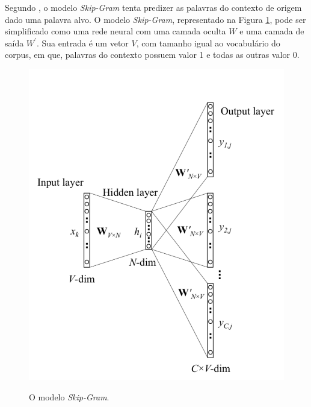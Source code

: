Segundo \textcite{Goldberg2014word2vecED}, o modelo \textit{Skip-Gram} tenta predizer as palavras do contexto de origem dado uma palavra alvo. O modelo \textit{Skip-Gram}, representado na Figura \ref{fig:skip-gram}, pode ser simplificado como uma rede neural com uma camada oculta $W$ e uma camada de saída $W^\prime$. Sua entrada é um vetor $V$, com tamanho igual ao vocabulário do corpus, em que, palavras do contexto possuem valor 1 e todas as outras valor 0.

\begin{figure}[htbp]
    \centering
        \caption{O modelo \textit{Skip-Gram}.}
        \includegraphics[scale=0.7]{resources/images/pln/skip-gram.png}
        \label{fig:skip-gram}
\end{figure}

